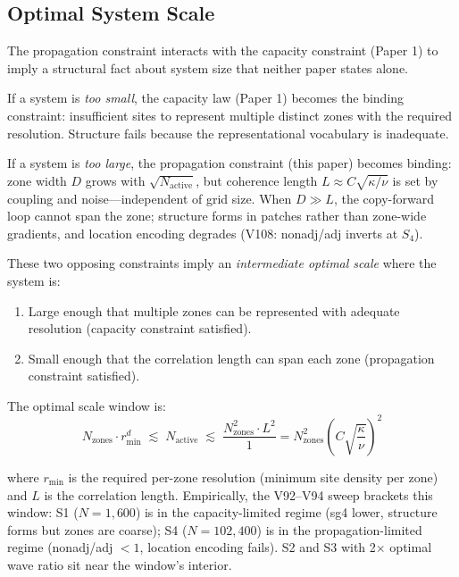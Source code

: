 \documentclass[11pt]{article}
\begin{document}
\subsection{Optimal System Scale}

The propagation constraint interacts with the capacity constraint (Paper 1) to imply a structural fact about system size that neither paper states alone.

If a system is \emph{too small}, the capacity law (Paper 1) becomes the binding constraint:
insufficient sites to represent multiple distinct zones with the required resolution.
Structure fails because the representational vocabulary is inadequate.

If a system is \emph{too large}, the propagation constraint (this paper) becomes binding:
zone width $D$ grows with $\sqrt{N_{\text{active}}}$, but coherence length $L \approx C\sqrt{\kappa/\nu}$
is set by coupling and noise---independent of grid size.
When $D \gg L$, the copy-forward loop cannot span the zone; structure forms in patches rather
than zone-wide gradients, and location encoding degrades (V108: nonadj/adj inverts at $S_4$).

These two opposing constraints imply an \emph{intermediate optimal scale} where the system is:
\begin{enumerate}
  \item Large enough that multiple zones can be represented with adequate resolution (capacity constraint satisfied).
  \item Small enough that the correlation length can span each zone (propagation constraint satisfied).
\end{enumerate}

The optimal scale window is:
\begin{equation}
  N_{\text{zones}} \cdot r_{\min}^d \;\lesssim\; N_{\text{active}} \;\lesssim\;
  \frac{N_{\text{zones}}^2 \cdot L^2}{1}
  = N_{\text{zones}}^2 \left(C\sqrt{\frac{\kappa}{\nu}}\right)^2
\end{equation}

where $r_{\min}$ is the required per-zone resolution (minimum site density per zone) and $L$ is the correlation length.
Empirically, the V92--V94 sweep brackets this window: S1 ($N=1{,}600$) is in the capacity-limited
regime (sg4 lower, structure forms but zones are coarse); S4 ($N=102{,}400$) is in the propagation-limited
regime (nonadj/adj $< 1$, location encoding fails). S2 and S3 with 2$\times$ optimal wave ratio sit
near the window's interior.
\end{document}

